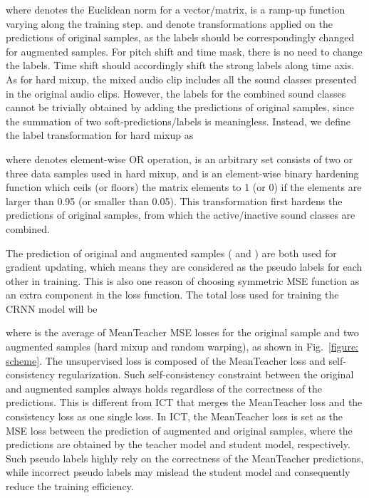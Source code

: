 \documentclass[a4paper]{article}
\begin{document}
where  denotes the Euclidean norm for a vector/matrix,  is a ramp-up function varying along the training step.  and  denote transformations applied on the predictions of original samples, as the labels should be correspondingly changed for augmented samples. For pitch shift and time mask, there is no need to change the labels. Time shift should accordingly shift the strong labels along time axis. As for hard mixup, the mixed audio clip includes all the sound classes presented in the original audio clips. However, the labels for the combined sound classes cannot be trivially obtained by adding the predictions of original samples, since the summation of two soft-predictions/labels is meaningless. Instead, we define the label transformation for hard mixup as

where  denotes element-wise OR operation,  is an arbitrary set consists of two or three data samples used in hard mixup, and  is an element-wise binary hardening function which ceils (or floors) the matrix elements to 1 (or 0) if the elements are larger than 0.95 (or smaller than 0.05). This transformation first hardens the predictions of original samples, from which the active/inactive sound classes are combined. 

The prediction of original and augmented samples ( and ) are both used for gradient updating, which means they are considered as the pseudo labels for each other in training. This is also one reason of choosing symmetric MSE function as an extra component in the loss function. The total loss  used for training the CRNN model will be

where  is the average of MeanTeacher MSE losses for the original sample and two augmented samples (hard mixup and random warping), as shown in Fig.~\ref{figure: scheme}. The unsupervised loss is composed of the MeanTeacher loss and self-consistency regularization. Such self-consistency constraint between the original and augmented samples always holds regardless of the correctness of the predictions.  This is different from ICT  \cite{verma2019interpolation} that merges the MeanTeacher loss and the consistency loss as one single loss. In ICT, the MeanTeacher loss is set as the MSE loss between the prediction of augmented and original samples, where the predictions are obtained by the teacher model and student model, respectively. Such pseudo labels highly rely on the correctness of the MeanTeacher predictions, while incorrect pseudo labels may mislead the student model and consequently reduce the training efficiency.
\end{document}
